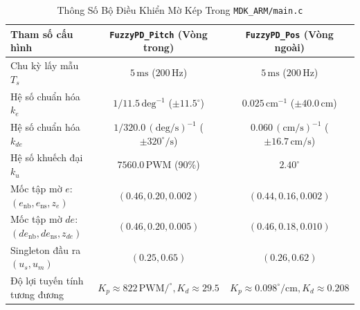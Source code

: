 \documentclass[10pt,a4paper,twocolumn]{article}
\begin{document}
\begin{table}[htbp]
\centering
\caption{Thông Số Bộ Điều Khiển Mờ Kép Trong \texttt{MDK\_ARM/main.c}}
\label{tab:params}
\footnotesize
\begin{tabular}{lcc}
\toprule
\textbf{Tham số cấu hình} & \textbf{\texttt{FuzzyPD\_Pitch} (Vòng trong)} & \textbf{\texttt{FuzzyPD\_Pos} (Vòng ngoài)} \\
\midrule
Chu kỳ lấy mẫu $T_s$ & $5\,\text{ms}$ ($200\,\text{Hz}$) & $5\,\text{ms}$ ($200\,\text{Hz}$) \\
Hệ số chuẩn hóa $k_e$ & $1/11.5\,\text{deg}^{-1}$ ($\pm 11.5^\circ$) & $0.025\,\text{cm}^{-1}$ ($\pm 40.0\,\text{cm}$) \\
Hệ số chuẩn hóa $k_{de}$ & $1/320.0\,(\text{deg/s})^{-1}$ ($\pm 320^\circ/\text{s}$) & $0.060\,(\text{cm/s})^{-1}$ ($\pm 16.7\,\text{cm/s}$) \\
Hệ số khuếch đại $k_u$ & $7560.0\,\text{PWM}$ (90\%) & $2.40^\circ$ \\
Mốc tập mờ $e$: $(e_{\text{nb}}, e_{\text{ns}}, z_e)$ & $(0.46, 0.20, 0.002)$ & $(0.44, 0.16, 0.002)$ \\
Mốc tập mờ $de$: $(de_{\text{nb}}, de_{\text{ns}}, z_{de})$ & $(0.46, 0.20, 0.005)$ & $(0.46, 0.18, 0.010)$ \\
Singleton đầu ra $(u_s, u_m)$ & $(0.25, 0.65)$ & $(0.26, 0.62)$ \\
Độ lợi tuyến tính tương đương & $K_p \approx 822\,\text{PWM}/^\circ, K_d \approx 29.5$ & $K_p \approx 0.098^\circ/\text{cm}, K_d \approx 0.208$ \\
\bottomrule
\end{tabular}
\end{table}
\end{document}
